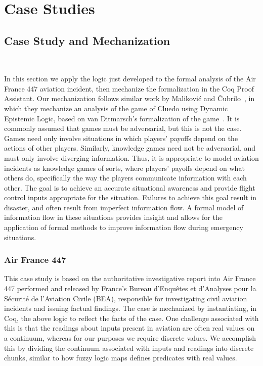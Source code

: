 \chapter{Case Studies}
	\label{CH_04}
\section{Case Study and Mechanization}~\label{mech}

In this section we apply the logic just developed to the formal analysis of the Air France 447 aviation incident, then mechanize the formalization in the Coq Proof Assistant. Our mechanization follows similar work by Malikovi\'c and \v Cubrilo~\cite{delcoq1,delcoq2}, in which they mechanize an analysis of the game of Cluedo using Dynamic Epistemic Logic, based on van Ditmarsch's formalization of the game~\cite{ditmarsch}. It is commonly assumed that games must be adversarial, but this is not the case. Games need only involve situations in which players' payoffs depend on the actions of other players. Similarly, knowledge games need not be adversarial, and must only involve diverging information. Thus, it is appropriate to model aviation incidents as knowledge games of sorts, where players' payoffs depend on what others do, specifically the way the players communicate information with each other. The goal is to achieve an accurate situational awareness and provide flight control inputs appropriate for the situation. Failures to achieve this goal result in disaster, and often result from imperfect information flow. A formal model of information flow in these situations provides insight and allows for the application of formal methods to improve information flow during emergency situations.
\subsection{Air France 447}
This case study is based on the authoritative investigative report into Air France 447 performed and released by France's  Bureau d'Enqu\^etes et d'Analyses pour la S\'ecurit\'e de l'Aviation Civile (BEA), responsible for investigating civil aviation incidents and issuing factual findings\cite{airfrance}. The case is mechanized by instantiating, in Coq, the above logic to reflect the facts of the case. One challenge associated with this is that the readings about inputs present in aviation are often real values on a continuum, whereas for our purposes we require discrete values. We accomplish this by dividing the continuum associated with inputs and readings into discrete chunks, similar to how fuzzy logic maps defines predicates with real values\cite{fuzzy}.

